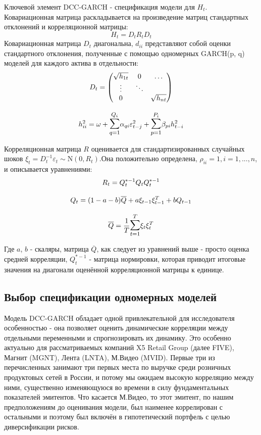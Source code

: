 \documentclass[a4paper,12pt,twoside]{article}
\begin{document}
Ключевой элемент DCC-GARCH - спецификация модели для $H_t$. Ковариационная матрица раскладывается на произведение матриц стандартных отклонений и корреляционной матрицы:
$$
H_t = D_t R_t D_t
$$
Ковариационная матрица $D_t$ диагональна, $d_{ii}$ представляют собой оценки стандартного отклонения, полученные с помощью одномерных GARCH(p, q) моделей для каждого актива в отдельности:
$$
\begin{gathered}
D_t = \begin{pmatrix}
    \sqrt{h_{1t}} & 0 & \dots \\
    \vdots & \ddots & \\
    0 &  & \sqrt{h_{nt}}
    \end{pmatrix}       \\[2ex]
h^{2}_{ii}= \omega +
            \mathlarger{\mathlarger{\sum}}_{q=1}^{Q_i} \alpha_{qi} \varepsilon^{2}_{t-j} +
            \mathlarger{\mathlarger{\sum}}_{p=1}^{P_i} \beta_{pi} h^{2}_{t-i}
\end{gathered}
$$

Корреляционная матрица $R$ оценивается для стандартизированных случайных шоков $\xi_t = D^{-1}_t \varepsilon_t \sim \mathrm{N}(0, R_t)$.Она положительно определена, $\rho_{ii}=1, i=1, ..., n$, и описывается уравнениями:
$$
\begin{gathered}
R_t = Q^{*-1}_t Q_t Q^{*-1}_t \\[2ex]
Q_t = (1-a-b) \overline{Q} + a \xi_{t-1} \xi^{T}_{t-1} + b Q_{t-1} \\[2ex]
\overline{Q} = \frac{1}{T} \mathlarger{\mathlarger{\sum}}_{t=1}^{T} \xi_t \xi^{T}_t
\end{gathered}
$$

Где $a$, $b$ - скаляры, матрица $\overline{Q}$, как следует из уравнений выше - просто оценка средней корреляции, $Q^{*-1}_t$ - матрица нормировки, которая приводит итоговые значения на диагонали оценённой корреляционной матрицы к единице.

\subsection{Выбор спецификации одномерных моделей}\label{specification}

Модель DCC-GARCH обладает одной привлекательной для исследователя особенностью - она позволяет оценить динамические корреляции между отдельными переменными и спрогнозировать их динамику. Это особенно актуально для рассматриваемых компаний X5 Retail Group (далее FIVE), Магнит (MGNT), Лента (LNTA), М.Видео (MVID). Первые три из перечисленных занимают три первых места по выручке среди розничных продуктовых сетей в России, и потому мы ожидаем высокую корреляцию между ними, существенно изменяющуюся во времени в силу фундаментальных показателей эмитентов. Что касается М.Видео, то этот эмитент, по нашим предположениям до оценивания модели, был наименее коррелирован с остальными и поэтому был включён в гипотетический портфель с целью диверсификации рисков.
\end{document}

